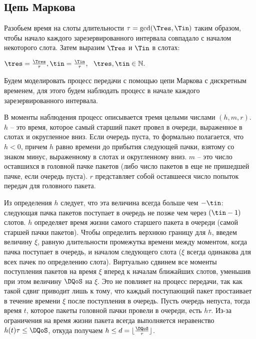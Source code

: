 \subsection{Цепь Маркова}

Разобьем время на слоты длительности $\tau = \gcd(\Tres,\Tin)$ таким образом, чтобы начало каждого зарезервированного интервала совпадало с началом некоторого слота. Затем выразим $\Tres$ и $\Tin$ в слотах:

\begin{center}
$\tres = \frac{\Tres}{\tau}, \tin = \frac{\Tin}{\tau}, ~~\tres, \tin \in \mathbb{N}.$
\end{center}

Будем моделировать процесс передачи с помощью цепи Маркова с дискретным временем, для этого будем наблюдать процесс в начале каждого зарезервированного интервала. 

\begin{figure}[h]
\end{figure}

В моменты наблюдения процесс описывается тремя целыми числами $(h,m,r)$. $h$ -- это время, которое самый старший пакет провел в очереди, выраженное  в слотах и округленное вниз. Если очередь пуста, то формально полагается, что $h < 0$, причем $h$ равно времени до прибытия следующей пачки, взятому со знаком минус, выраженному в слотах и округленному вниз. $m$ -- это число оставшихся в головной пачке пакетов (либо число пакетов в еще не пришедшей пачке, если очередь пуста). $r$ представляет собой оставшееся число попыток передач для головного пакета.


Из определения $h$ следует, что эта величина всегда больше чем $-\tin$: следующая пачка пакетов поступает в очередь не позже чем через $(\tin - 1)$ слотов. $h$ определяет время жизни самого старшего пакета в очереди (самой старшей пачки пакетов). Чтобы определить верхнюю границу для $h$, введем величину $\xi$, равную длительности промежутка времени между моментом, когда пачка поступает в очередь, и началом следующего слота ($\xi$ всегда одинакова для всех пачек по определению слота). Виртуально сдвинем все моменты поступления пакетов на время $\xi$ вперед к началам ближайших слотов, уменьшив при этом величину $\DQoS$ на $\xi$. Это не повлияет на процесс передачи, так как такой сдвиг приводит лишь к тому, что каждый поступающий пакет простаивает в течение времени $\xi$ после поступления в очередь. Пусть очередь непуста, тогда время $t$, которое пакеты головной пачки провели в очереди, есть $h\tau$. Из-за ограничения на время жизни пакета всегда выполняется неравенство $h(t)\tau \leq \DQoS$, откуда получаем $h \leq d = \lfloor \frac{\DQoS}{\tau} \rfloor$.   

